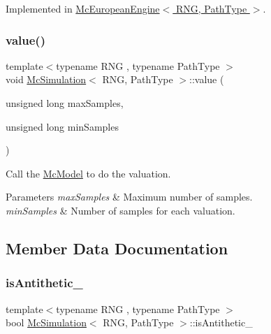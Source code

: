 Implemented in \hyperlink{class_mc_european_engine_ae4e0ab6834416144221f1a91dd154587}{Mc\+European\+Engine$<$ R\+N\+G, Path\+Type $>$}.

\hypertarget{class_mc_simulation_ae2f03b55464c189295aab9b8fd7b0a37}{}\label{class_mc_simulation_ae2f03b55464c189295aab9b8fd7b0a37} 
\subsubsection{\texorpdfstring{value()}{value()}}
{\footnotesize\ttfamily template$<$typename R\+NG , typename Path\+Type $>$ \\
void \hyperlink{class_mc_simulation}{Mc\+Simulation}$<$ R\+NG, Path\+Type $>$\+::value (\begin{DoxyParamCaption}\item[{unsigned long}]{max\+Samples,  }\item[{unsigned long}]{min\+Samples }\end{DoxyParamCaption})\hspace{0.3cm}{\ttfamily [private]}}



Call the \hyperlink{class_mc_model}{Mc\+Model} to do the valuation. 


\begin{DoxyParams}{Parameters}
{\em max\+Samples} & Maximum number of samples. \\
\hline
{\em min\+Samples} & Number of samples for each valuation. \\
\hline
\end{DoxyParams}


\subsection{Member Data Documentation}
\hypertarget{class_mc_simulation_af17f26f85e3f48406229d7b6f84b3f89}{}\label{class_mc_simulation_af17f26f85e3f48406229d7b6f84b3f89} 
\subsubsection{\texorpdfstring{is\+Antithetic\+\_\+}{isAntithetic\_}}
{\footnotesize\ttfamily template$<$typename R\+NG , typename Path\+Type $>$ \\
bool \hyperlink{class_mc_simulation}{Mc\+Simulation}$<$ R\+NG, Path\+Type $>$\+::is\+Antithetic\+\_\+\hspace{0.3cm}{\ttfamily [private]}}



